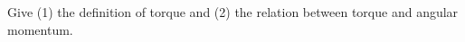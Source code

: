 

\vspace*{\fill}
\centering

Give (1) the definition of torque and (2) the relation between torque and angular momentum.

\centering
\vspace*{\fill}

